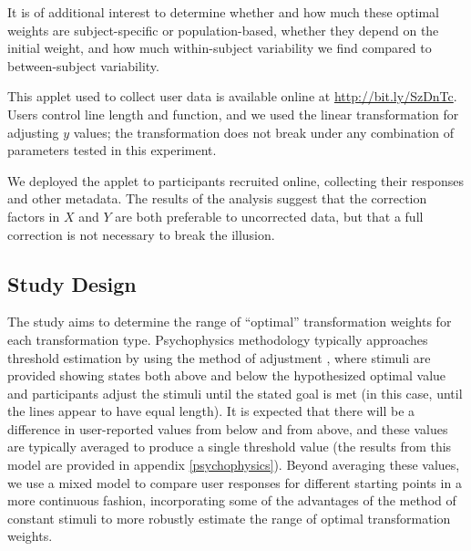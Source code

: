 \documentclass[12pt]{article}\usepackage[]{graphicx}\usepackage[]{color}
\begin{document}
It is of additional interest to determine whether and how much these optimal weights are subject-specific or population-based, whether they depend on the initial weight, and how much within-subject variability we find compared to between-subject variability. 


% 
% 

This applet used to collect user data is  available online at \url{http://bit.ly/SzDnTc}. Users control line length and function, and we used the linear transformation for adjusting $y$ values; the transformation does not break under any combination of parameters tested in this experiment. 


\noindent
We deployed the applet to participants recruited online, collecting their responses and other metadata. The results of the analysis suggest that the correction factors in $X$ and $Y$ are both preferable to uncorrected data, but that a full correction is not necessary to break the illusion.



\subsection{Study Design}
The study aims to determine the range of ``optimal'' transformation weights for each transformation type. Psychophysics methodology typically approaches threshold estimation by using the method of adjustment \citep{goldstein}, where  stimuli are provided showing states both above and below the hypothesized optimal value and  participants adjust the stimuli until the stated goal is met (in this case, until the lines appear to have equal length). It is expected that there will be a difference in user-reported values from below and from above, and these values are typically averaged to produce a single threshold value (the results from this model are provided in appendix \ref{psychophysics}). Beyond averaging these values, we use a mixed model to compare user responses for different starting points in a more continuous fashion, incorporating some of the advantages of the method of constant stimuli to more robustly estimate the range of optimal transformation weights. %
\end{document}
